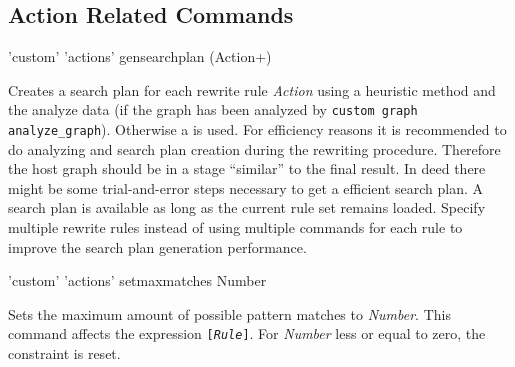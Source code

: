 \subsection{Action Related Commands}
\begin{rail}
  'custom' 'actions' gensearchplan (Action+)
\end{rail}
Creates a search plan for each rewrite rule \emph{Action} using a heuristic method and the analyze data (if the graph has been analyzed by \texttt{custom graph analyze\_graph}). Otherwise a  is used. For efficiency reasons it is recommended to do analyzing and search plan creation during the rewriting procedure. Therefore the host graph should be in a stage ``similar'' to the final result. In deed there might be some trial-and-error steps necessary to get a efficient search plan. A search plan is available as long as the current rule set remains loaded. 
Specify multiple rewrite rules instead of using multiple commands for each rule to improve the search plan generation performance.

\begin{rail}
  'custom' 'actions' setmaxmatches Number
\end{rail}
Sets the maximum amount of possible pattern matches to \emph{Number}. This command affects the expression \texttt{[\emph{Rule}]}. For \emph{Number} less or equal to zero, the constraint is reset.


